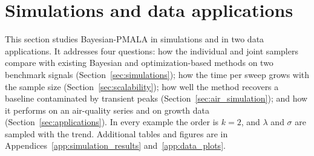 \section{Simulations and data applications}\label{sec:numerical}
This section studies Bayesian-PMALA in simulations and in two data applications. It addresses four questions: how the individual and joint samplers compare with existing Bayesian and optimization-based methods on two benchmark signals (Section~\ref{sec:simulations}); how the time per sweep grows with the sample size (Section~\ref{sec:scalability}); how well the method recovers a baseline contaminated by transient peaks (Section~\ref{sec:air_simulation}); and how it performs on an air-quality series and on growth data (Section~\ref{sec:applications}). In every example the order is $k = 2$, and $\lambda$ and $\sigma$ are sampled with the trend. Additional tables and figures are in Appendices~\ref{app:simulation_results} and~\ref{app:data_plots}.





